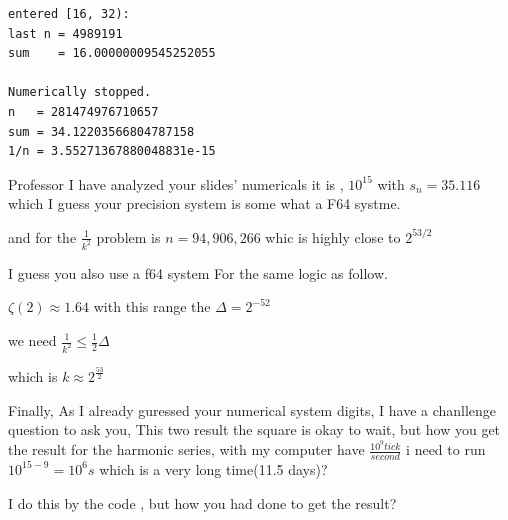 \begin{lstlisting}
entered [16, 32):
last n = 4989191
sum    = 16.00000009545252055

Numerically stopped.
n   = 281474976710657
sum = 34.12203566804787158
1/n = 3.55271367880048831e-15
\end{lstlisting}

Professor I have analyzed your slides' numericals
it is , \(10^{15}\) with \(s_n=35.116\) which I guess your
precision system is some what a F64 systme.

and for the \(\frac{1}{k^2}\) problem is
\(n=94,906,266\) whic is highly close to \(2^{53/2}\)

I guess you also use a f64 system For the same logic as follow.

\(\zeta(2)\approx 1.64\) with this range the \(\Delta=2^{-52}\)

we need \(\frac{1}{k^2}\le \frac{1}{2}\Delta\)

which is \(k\approx 2^{\frac{53}{2}}\)

Finally, As I already guressed your numerical system digits,
I have a chanllenge question
to ask you, This two result the square is okay to
wait, but how you get the result for the harmonic series,
with my computer have \(\frac{10^9tick}{second}\) i need to run
\(10^{15-9}=10^{6}s\) which is a very long time(11.5 days)?

I do this by the code \cite[accelerated]{accelerated},
but how you had done to get the result?










